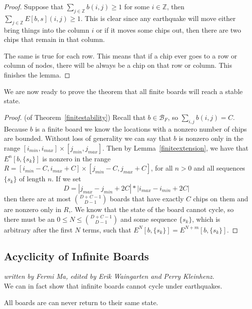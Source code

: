 \documentclass[runningheads,a4paper]{llncs}
\begin{document}
\begin{proof}
Suppose that $\sum_{j\in \mathbb{Z}} b(i,j) \geq 1$ for some $i \in \mathbb{Z}$, then $\sum_{j \in \mathbb{Z}} E[b, s](i,j) \geq 1$. This is clear since any earthquake will move either bring things into the column $i$ or if it moves some chips out, then there are two chips that remain in that column.

The same is true for each row. This means that if a chip ever goes to a row or column of nodes, there will be always be a chip on that row or column. This finishes the lemma. 
\end{proof}

We are now ready to prove the theorem that all finite boards will reach a stable state. 

\begin{proof}
(of Theorem~\ref{finitestability}) Recall that $b \in \mathcal{B}_F$, so $\sum_{i,j} b(i,j) = C$. Because $b$ is a finite board we know the locations with a nonzero number of chips are bounded.  Without loss of generality we can say that $b$ is nonzero only in the range $[i_{min}, i_{max}] \times [j_{min}, j_{max}]$. Then by Lemma~\ref{finiteextension}, we have that $E^n[b, \{s_k \}]$ is nonzero in the range $ R=[i_{min}-C, i_{max}+C] \times [j_{min}-C, j_{max}+C]$, for all $n>0$ and all sequences $\{ s_k \}$ of length $n$.
If we set 
\begin{equation*}
D= |j_{max}-j_{min} + 2C|*|i_{max} - i_{min} + 2C|
\end{equation*}
then there are at most  $\binom{D+C-1}{D-1}$  boards that have exactly $C$ chips on them and are nonzero only in $R$,. We know that the state of the board cannot cycle, so there must be an $0 \leq N \leq \binom{D+C-1}{D-1}$ and some sequence $\{s_k\}$, which is arbitrary after the first $N$ terms, such that $E^N[ b, \{s_k\}] = E^{N+m}[b, \{s_k\}]$. 
\end{proof}

\subsection{Acyclicity of Infinite Boards}
\label{Acyclicity of Infinite Boards}
\emph{written by Fermi Ma, edited by Erik Waingarten and Perry Kleinhenz.}\\

We can in fact show that infinite boards cannot cycle under earthquakes. 

\begin{corollary}
All boards are can never return to their same state.
\end{corollary}
\end{document}
